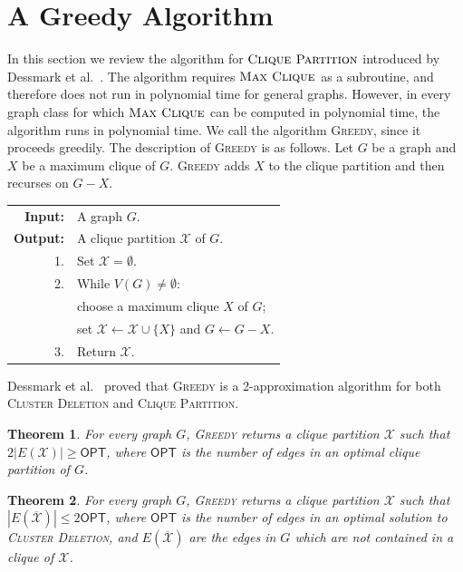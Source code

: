 \documentclass[a4paper,fleqn]{cas-sc}
\newtheorem{thm}{Theorem}[section]
\theoremstyle{remark}
\theoremstyle{plain}
\newcommand{\defn}[1]{\emph{#1}}
\newcommand{\cd}{\textsc{Cluster Deletion}}
\newcommand{\cp}{\textsc{Clique Partition}}
\newcommand{\mc}{\textsc{Max Clique}}
\newcommand{\greedy}{{\textsc{Greedy}}}
\newcommand{\opt}{{\mathsf{OPT}}}
\begin{document}
\section{A Greedy Algorithm}
In this section we review the algorithm for $\cp$ introduced by Dessmark et al.~\cite{DESSMARK2007}.
The algorithm requires $\mc$ as a subroutine, and therefore does not run in polynomial time for general graphs.  However, in every graph class for which $\mc$ can be computed in polynomial time, the algorithm runs in polynomial time. We call the algorithm \greedy, since it proceeds greedily.  The description of \greedy{} is as follows.  Let $G$ be a graph and $X$ be a maximum clique of $G$.  \greedy{} adds $X$ to the clique partition and then recurses on $G-X$.  


\begin{algorithm}[h!]
\caption{\greedy}
\begin{tabularx}{\columnwidth}{@{}rX@{}}
\textbf{Input:} & A graph $G$.\\
\textbf{Output:} & A clique partition $\mathcal X$ of $G$.\\[2pt]
1. & Set $\mathcal X=\emptyset$.\\
2. & While $V(G)\neq\emptyset$:\\
   & \quad choose a maximum clique $X$ of $G$;\\
   & \quad set $\mathcal X\gets\mathcal X\cup\{X\}$ and $G\gets G-X$.\\
3. & Return $\mathcal X$.
\end{tabularx}

\end{algorithm}

  
Dessmark et al.~\cite{DESSMARK2007} proved that \greedy{} is a 2-approximation algorithm for both \cd{} and \cp.
 
\begin{thm} \label{thm:greedy1}
    For every graph $G$, \greedy{} returns a clique partition $\mathcal{X}$ such that $2|E(\mathcal{X})| \geq \opt$, where $\opt$ is the number of edges in an optimal clique partition of $G$. 
\end{thm}


\begin{thm} \label{thm:greedy2}
    For every graph $G$, \greedy{} returns a clique partition $\mathcal{X}$ such that $|E(\overline{\mathcal{X}})| \leq 2\opt$, where $\opt$ is the number of edges in an optimal solution to \cd, and $E(\overline{\mathcal{X}})$ are the edges in $G$ which are not contained in a clique of $\mathcal X$. 
\end{thm}
\end{document}
